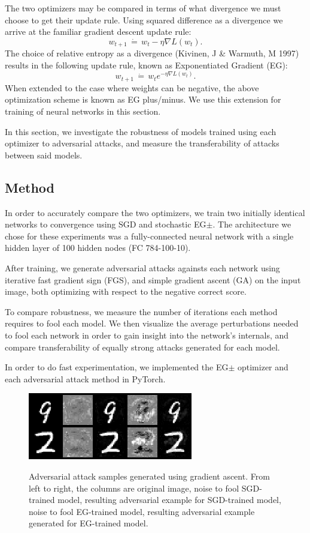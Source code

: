 \documentclass{asaproc}
\begin{document}
The two optimizers may be compared in terms of what divergence we must choose to get their update rule.
Using squared difference as a divergence we arrive at the familiar gradient descent update rule:
$$ w_{t+1} \, \dot{=} \, w_t - \eta \nabla L(w_t). $$
The choice of relative entropy as a divergence (Kivinen, J \& Warmuth, M 1997) results in the following update rule, known as Exponentiated Gradient (EG):
$$ w_{t+1} \, \dot{=} \, w_t e^{-\eta \nabla L(w_t)}. $$
When extended to the case where weights can be negative, the above optimization scheme is known as EG plus/minus. We use this extension for training of neural networks in this section.

In this section, we investigate the robustness of models trained using each optimizer to adversarial attacks, and measure the transferability of attacks between said models.

\subsection*{Method}

In order to accurately compare the two optimizers, we train two initially identical networks to convergence using SGD and stochastic EG$\pm$. The architecture we chose for these experiments was a fully-connected neural network with a single hidden layer of 100 hidden nodes (FC 784-100-10).

After training, we generate adversarial attacks againsts each network using iterative fast gradient sign (FGS), and simple gradient ascent (GA) on the input image, both optimizing with respect to the negative correct score.

To compare robustness, we measure the number of iterations each method requires to fool each model. We then visualize the average perturbations needed to fool each network in order to gain insight into the network's internals, and compare transferability of equally strong attacks generated for each model.

In order to do fast experimentation, we implemented the EG$\pm$ optimizer and each adversarial attack method in PyTorch.

\begin{figure}
	\centering
	\caption{\enspace Adversarial attack samples generated using gradient ascent. From left to right, the columns are original image, noise to fool SGD-trained model, resulting adversarial example for SGD-trained model, noise to fool EG-trained model, resulting adversarial example generated for EG-trained model.}
	\includegraphics[width=\linewidth]{mnist_attacks.png}
	\label{fig6}
\end{figure}
\end{document}
